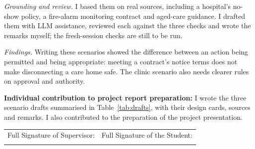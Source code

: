 \documentclass[12pt, a4paper, oneside]{report}
\begin{document}
\textit{Grounding and review.} I based them on real sources, including a hospital's no-show policy, a fire-alarm monitoring contract and aged-care guidance. I drafted them with LLM assistance, reviewed each against the three checks and wrote the remarks myself; the fresh-session checks are still to be run.

\textit{Findings.} Writing these scenarios showed the difference between an action being permitted and being appropriate: meeting a contract's notice terms does not make disconnecting a care home safe. The clinic scenario also needs clearer rules on approval and authority.

\vspace{8pt}
\noindent\textbf{Individual contribution to project report preparation:}
I wrote the three scenario drafts summarised in Table~\ref{tab:drafts}, with their design cards, sources and remarks. I also contributed to the preparation of the project presentation.

\vspace{1cm}

\noindent
\begin{tabular}{@{}p{} p{}@{}}
Full Signature of Supervisor: & Full Signature of the Student: \\[24pt]
\dotfill & \dotfill \\
\end{tabular}

\newpage



\end{document}
